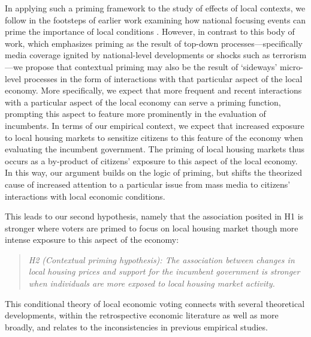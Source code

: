\documentclass[12pt,a4paper]{article}
\begin{document}
	In applying such a priming framework to the study of effects of local contexts, we follow in the footsteps of earlier work examining how national focusing events can prime the importance of local conditions \citep[e.g.,] []{hopkins2010politicized,legewie2013terrorist}. However, in contrast to this body of work, which emphasizes priming as the result of top-down processes—specifically media coverage ignited by national-level developments or shocks such as terrorism—we propose that contextual priming may also be the result of `sideways’ micro-level processes in the form of interactions with that particular aspect of the local economy. More specifically, we expect that more frequent and recent interactions with a particular aspect of the local economy can serve a priming function, prompting this aspect to feature more prominently in the evaluation of incumbents. In terms of our empirical context, we expect that increased exposure to local housing markets to sensitize citizens to this feature of the economy when evaluating the incumbent government. The priming of local housing markets thus occurs as a by-product of citizens’ exposure to this aspect of the local economy. In this way, our argument builds on the logic of priming, but shifts the theorized cause of increased attention to a particular issue from mass media to citizens’ interactions with local economic conditions.
	
	This leads to our second hypothesis, namely that the association posited in H1 is stronger where voters are primed to focus on local housing market though more intense exposure to this aspect of the economy:
	
	\newcommand{\htwo}{the contextual priming hypothesis}
	\begin{quote}
		\textit{H2 (Contextual priming hypothesis): The association between changes in local housing prices and support for the incumbent government is stronger when individuals are more exposed to local housing market activity.}
	\end{quote}
	
	This conditional theory of local economic voting connects with several theoretical developments, within the retrospective economic literature as well as more broadly, and relates to the inconsistencies in previous empirical studies. 
	
\end{document}

